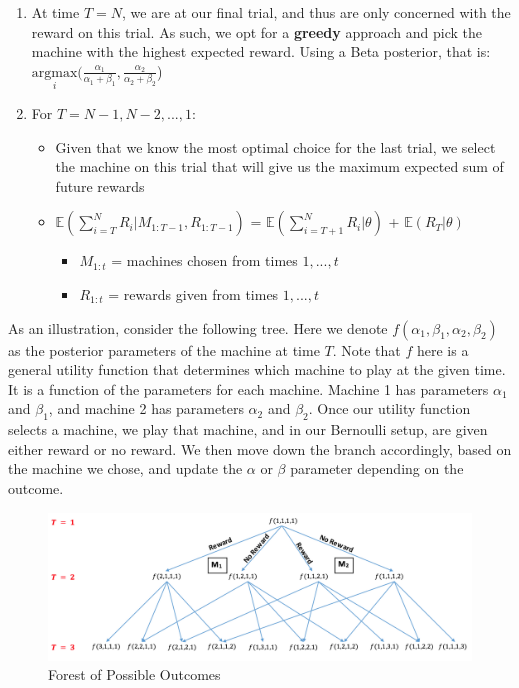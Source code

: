 \documentclass{article}
\begin{document}
\begin{enumerate}
\item At time $T = N$, we are at our final trial, and thus are only concerned with the reward on this trial. As such, we opt for a \textbf{greedy} approach and pick the machine with the highest expected reward. Using a Beta posterior, that is:  $\underset{i}{\text{argmax}}(\frac{\alpha_1}{\alpha_1 + \beta_1}, \frac{\alpha_2}{\alpha_2 + \beta_2}$)

\item For $T = N-1,N-2,..., 1$:
	\begin{itemize}
	\item Given that we know the most optimal choice for the last trial, we select the machine on this trial that will give us the maximum expected sum of future rewards
	\item $\mathbb{E}(\displaystyle\sum_{i=T}^{N} R_i|M_{1:T-1}, R_{1:T-1})$ = $\mathbb{E}(\displaystyle\sum_{i=T+1}^{N} R_i|\theta)$ + $\mathbb{E}(R_T|\theta)$ 
	
\begin{itemize}
	\item $M_{1:t}$ = machines chosen from times $1, ..., t$ 
	\item $R_{1:t}$ = rewards given from times $1, ..., t$
	\end{itemize}

	\end{itemize}

\end{enumerate}



As an illustration, consider the following tree. Here we denote $f(\alpha_1, \beta_1, \alpha_2, \beta_2)$ as the posterior parameters of the machine at time $T$. Note that $f$ here is a general utility function that determines which machine to play at the given time. It is a function of the parameters for each machine. Machine 1 has parameters $\alpha_1$ and $\beta_1$, and machine 2 has parameters $\alpha_2$ and $\beta_2$. Once our utility function selects a machine, we play that machine, and in our Bernoulli setup, are given either reward or no reward. We then move down the branch accordingly, based on the machine we chose, and update the $\alpha$ or $\beta$ parameter depending on the outcome.

\begin{figure}[H]
\centering
\includegraphics[scale=0.75]{Dynamic_Programming_Tree.png}
\caption{Forest of Possible Outcomes}
\end{figure}
\end{document}
